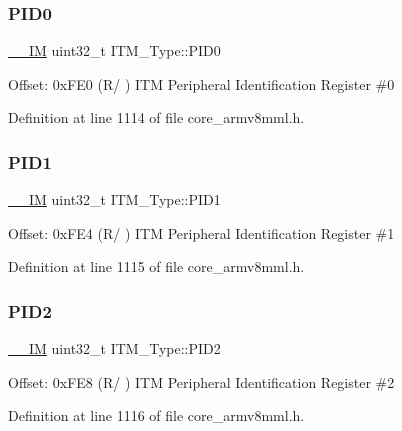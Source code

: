 \mbox{\label{struct_i_t_m___type_ab4a4cc97ad658e9c46cf17490daffb8a}} 
\subsubsection{\texorpdfstring{P\+I\+D0}{PID0}}
{\footnotesize\ttfamily \hyperlink{core__sc300_8h_a4cc1649793116d7c2d8afce7a4ffce43}{\+\_\+\+\_\+\+IM} uint32\+\_\+t I\+T\+M\+\_\+\+Type\+::\+P\+I\+D0}

Offset\+: 0x\+F\+E0 (R/ ) I\+TM Peripheral Identification Register \#0 

Definition at line 1114 of file core\+\_\+armv8mml.\+h.

\mbox{\label{struct_i_t_m___type_a89ea1d805a668d6589b22d8e678eb6a4}} 
\subsubsection{\texorpdfstring{P\+I\+D1}{PID1}}
{\footnotesize\ttfamily \hyperlink{core__sc300_8h_a4cc1649793116d7c2d8afce7a4ffce43}{\+\_\+\+\_\+\+IM} uint32\+\_\+t I\+T\+M\+\_\+\+Type\+::\+P\+I\+D1}

Offset\+: 0x\+F\+E4 (R/ ) I\+TM Peripheral Identification Register \#1 

Definition at line 1115 of file core\+\_\+armv8mml.\+h.

\mbox{\label{struct_i_t_m___type_a8471c4d77b7107cf580587509da69f38}} 
\subsubsection{\texorpdfstring{P\+I\+D2}{PID2}}
{\footnotesize\ttfamily \hyperlink{core__sc300_8h_a4cc1649793116d7c2d8afce7a4ffce43}{\+\_\+\+\_\+\+IM} uint32\+\_\+t I\+T\+M\+\_\+\+Type\+::\+P\+I\+D2}

Offset\+: 0x\+F\+E8 (R/ ) I\+TM Peripheral Identification Register \#2 

Definition at line 1116 of file core\+\_\+armv8mml.\+h.

